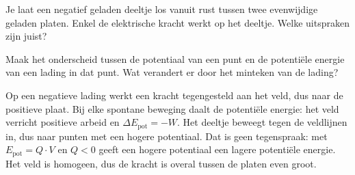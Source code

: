 \documentclass{ximera}
\begin{document}
\begin{question}
    Je laat een negatief geladen deeltje los vanuit rust tussen twee evenwijdige geladen platen. Enkel de elektrische kracht werkt op het deeltje. Welke uitspraken zijn juist?

    \begin{selectAll}
    \end{selectAll}

    \begin{hint}
        Maak het onderscheid tussen de potentiaal van een punt en de potentiële energie van een lading in dat punt. Wat verandert er door het minteken van de lading?
    \end{hint}

    \begin{solution}\nl
        Op een negatieve lading werkt een kracht tegengesteld aan het veld, dus naar de positieve plaat. Bij elke spontane beweging daalt de potentiële energie: het veld verricht positieve arbeid en $\Delta E_{\text{pot}} = -W$. Het deeltje beweegt tegen de veldlijnen in, dus naar punten met een hogere potentiaal. Dat is geen tegenspraak: met $E_{\text{pot}} = Q \cdot V$ en $Q < 0$ geeft een hogere potentiaal een lagere potentiële energie. Het veld is homogeen, dus de kracht is overal tussen de platen even groot.
    \end{solution}
\end{question}
\end{document}
